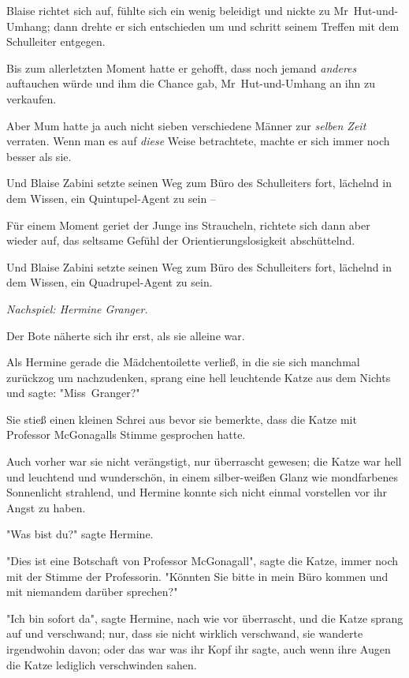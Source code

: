 {Blaise richtet sich auf, fühlte sich ein wenig beleidigt und nickte zu Mr~Hut-und-Umhang; dann drehte er sich entschieden um und schritt seinem Treffen mit dem Schulleiter entgegen.

Bis zum allerletzten Moment hatte er gehofft, dass noch jemand \emph{anderes} auftauchen würde und ihm die Chance gab, Mr~Hut-und-Umhang an ihn zu verkaufen.

Aber Mum hatte ja auch nicht sieben verschiedene Männer zur \emph{selben Zeit} verraten. Wenn man es auf \emph{diese} Weise betrachtete, machte er sich immer noch besser als sie.

Und Blaise Zabini setzte seinen Weg zum Büro des Schulleiters fort, lächelnd in dem Wissen, ein Quintupel-Agent zu sein --

Für einem Moment geriet der Junge ins Straucheln, richtete sich dann aber wieder auf, das seltsame Gefühl der Orientierungslosigkeit abschüttelnd.

Und Blaise Zabini setzte seinen Weg zum Büro des Schulleiters fort, lächelnd in dem Wissen, ein Quadrupel-Agent zu sein.

\emph{Nachspiel: Hermine Granger.}

Der Bote näherte sich ihr erst, als sie alleine war.

Als Hermine gerade die Mädchentoilette verließ, in die sie sich manchmal zurückzog um nachzudenken, sprang eine hell leuchtende Katze aus dem Nichts und sagte: "Miss~Granger?"

Sie stieß einen kleinen Schrei aus bevor sie bemerkte, dass die Katze mit Professor McGonagalls Stimme gesprochen hatte.

Auch vorher war sie nicht verängstigt, nur überrascht gewesen; die Katze war hell und leuchtend und wunderschön, in einem silber-weißen Glanz wie mondfarbenes Sonnenlicht strahlend, und Hermine konnte sich nicht einmal vorstellen vor ihr Angst zu haben.

"Was bist du?" sagte Hermine.

"Dies ist eine Botschaft von Professor McGonagall", sagte die Katze, immer noch mit der Stimme der Professorin. "Könnten Sie bitte in mein Büro kommen und mit niemandem darüber sprechen?"

"Ich bin sofort da", sagte Hermine, nach wie vor überrascht, und die Katze sprang auf und verschwand; nur, dass sie nicht wirklich verschwand, sie wanderte irgendwohin davon; oder das war was ihr Kopf ihr sagte, auch wenn ihre Augen die Katze lediglich verschwinden sahen.

}
